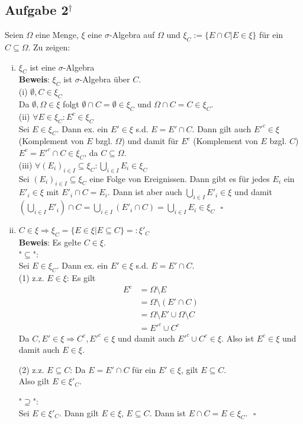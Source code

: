\documentclass[11pt,a4paper,ngerman]{article}
\newcommand{\set}[1]{ \{ #1 \}}
\begin{document}
\subsection*{Aufgabe 2$^\dagger$}
Seien $\Omega$ eine Menge, $\xi$ eine $\sigma$-Algebra auf $\Omega$ und $\xi_C := \set{E \cap C | E \in \xi}$ für ein $C \subseteq \Omega$.
Zu zeigen:
\begin{enumerate}[(i)]
\item $\xi_C$ ist eine $\sigma$-Algebra \\
\textbf{Beweis}: $\xi_C$ ist $\sigma$-Algebra über $C$. \\
(i) $\emptyset ,C \in \xi_C$ \\
Da $\emptyset, \Omega \in \xi$ folgt $\emptyset \cap C = \emptyset \in \xi_C$ und $\Omega \cap C = C \in \xi_C$.\\
(ii) $\forall E \in \xi_C: E^c \in \xi_C$ \\
Sei $E \in \xi_C$. Dann ex. ein $E' \in \xi$ s.d. $E = E' \cap C$. Dann gilt auch $E'^c \in \xi$ (Komplement von $E$ bzgl. $\Omega$) und damit für 
$E^c$ (Komplement von $E$ bzgl. $C$) $E^c = E'^c \cap C \in \xi_C$, da $C \subseteq \Omega$. \\
(iii) $\forall \left(E_i\right)_{i \in I} \subseteq \xi_C: \bigcup_{i \in I} {E_i} \in \xi_C$  \\
Sei $\left(E_i\right)_{i \in I} \subseteq \xi_C$ eine Folge von Ereignissen. Dann gibt es für jedes $E_i$ ein $E'_i \in \xi$ mit $E'_i \cap C = E_i$.
Dann ist aber auch $\bigcup_{i \in I} E'_i \in \xi$ und damit $\left( \bigcup_{i \in I} E'_i \right) \cap C = \bigcup_{i \in I} \left( E'_i \cap C \right) = \bigcup_{i \in I} E_i \in \xi_C$
$\mbox{}$ \hfill $\square$
\item $C \in \xi \Rightarrow \xi_C = \set{E \in \xi | E \subseteq C} =: \xi'_C$ \\
\textbf{Beweis}: Es gelte $C \in \xi$. \\
"$\subseteq$": \\
Sei $E \in \xi_C$. Dann ex. ein $E' \in \xi$ s.d. $E = E' \cap C$. \\
(1) z.z. $E \in \xi$: Es gilt
\begin{equation}\begin{split}
E^c &= \Omega \setminus E \\
&= \Omega \setminus \left(E' \cap C \right) \\
&= \Omega \setminus E' \cup \Omega \setminus C \\
&= E'^c \cup C^c
\end{split}\end{equation}
Da $C, E' \in \xi \Rightarrow C^c, E'^c \in \xi$ und damit auch $E'^c \cup C^c \in \xi$. Also ist $E^c \in \xi$ und damit auch $E \in \xi$.

(2) z.z. $E \subseteq C$: Da $E = E' \cap C$ für ein $E' \in \xi$, gilt $E \subseteq C$.\\
Also gilt $E \in \xi'_C$.

"$\supseteq$": \\
Sei $E \in \xi'_C$. Dann gilt $E \in \xi$, $E \subseteq C$. Dann ist  $E \cap C = E \in \xi_C$.
$\mbox{}$ \hfill $\square$
\end{enumerate}
\end{document}
